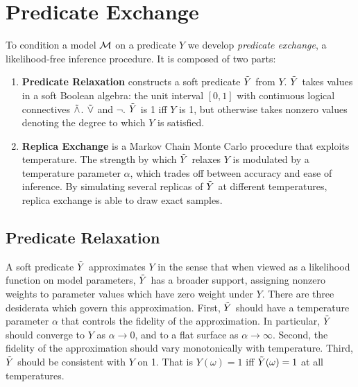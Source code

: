 \section{Predicate Exchange}

To condition a model ${\mathcal{M}}$ on a predicate $Y$ we develop \emph{predicate exchange}, a likelihood-free inference procedure.  It is composed of two parts:
\begin{enumerate}
\item \textbf{Predicate Relaxation} constructs a soft predicate $\tilde{Y}$ from $Y$. $\tilde{Y}$ takes values   in a soft Boolean algebra: the unit interval $[0, 1]$ with continuous logical connectives $\mathrel{\tilde{\land}}$. $\mathrel{\tilde{\lor}}$ and $\neg$. 
$\tilde{Y}$ is 1 iff $Y$ is 1, but otherwise takes nonzero values denoting the degree to which $Y$ is satisfied.
\item  \textbf{Replica Exchange} is a Markov Chain Monte Carlo procedure that exploits temperature. The strength by which $\tilde{Y}$ relaxes $Y$ is modulated by a temperature parameter $\alpha$, which trades off between accuracy and ease of inference.  By simulating several replicas of $\tilde{Y}$ at different temperatures, replica exchange is able to draw exact samples. 
\end{enumerate}



\subsection{Predicate Relaxation}\label{predexchange}

A soft predicate $\tilde{Y}$ approximates $Y$ in the sense that when viewed as a likelihood function on model parameters, $\tilde{Y}$ has a broader support, assigning nonzero weights to parameter values which have zero weight under $Y$.
There are three desiderata which govern this approximation.
First, $\tilde{Y}$ should have a temperature parameter $\alpha$ that controls the fidelity of the approximation. In particular, $\tilde{Y}$ should converge to $Y$ as $\alpha \to 0$, and to a flat surface as $\alpha \to \infty$. Second, the fidelity of the approximation should vary monotonically with temperature. Third, $\tilde{Y}$ should be consistent with $Y$ on 1. That is $Y(\omega) = 1$ iff $\tilde{Y}(\omega) = 1$ at all temperatures.  


